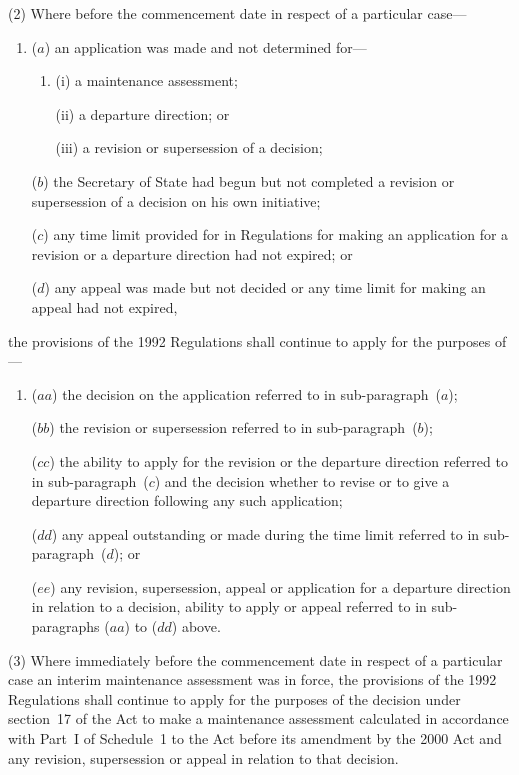 \documentclass[12pt,a4paper]{article}
\begin{document}
(2) Where before the commencement date in respect of a particular case—
\begin{enumerate}\item[]
($a$) an application was made and not determined for—
\begin{enumerate}\item[]
(i) a maintenance assessment;

(ii) a departure direction; or

(iii) a revision or supersession of a decision;
\end{enumerate}

($b$) the Secretary of State had begun but not completed a revision or supersession of a decision on his own initiative;

($c$) any time limit provided for in Regulations for making an application for a revision or a departure direction had not expired; or

($d$) any appeal was made but not decided or any time limit for making an appeal had not expired,
\end{enumerate}
the provisions of the 1992 Regulations shall continue to apply for the purposes of—
\begin{enumerate}\item[]
($aa$) the decision on the application referred to in sub-paragraph~($a$);

($bb$) the revision or supersession referred to in sub-paragraph~($b$);

($cc$) the ability to apply for the revision or the departure direction referred to in sub-paragraph~($c$)  and the decision whether to revise or to give a departure direction following any such application;

($dd$) any appeal outstanding or made during the time limit referred to in sub-paragraph~($d$); or

($ee$) any revision, supersession, appeal or application for a departure direction in relation to a decision, ability to apply or appeal referred to in sub-paragraphs ($aa$)  to ($dd$) above.
\end{enumerate}

(3) Where immediately before the commencement date in respect of a particular case an interim maintenance assessment was in force, the provisions of the 1992 Regulations shall continue to apply for the purposes of the decision under section~17 of the Act to make a maintenance assessment calculated in accordance with Part~I of Schedule~1 to the Act before its amendment by the 2000 Act and any revision, supersession or appeal in relation to that decision.
\end{document}
